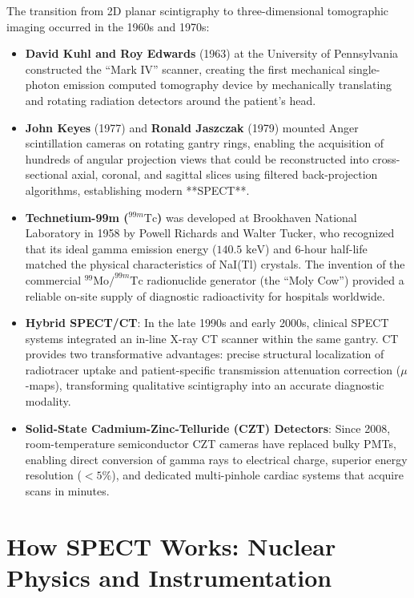 \documentclass[11pt,a4paper]{article}
\begin{document}
The transition from 2D planar scintigraphy to three-dimensional tomographic imaging occurred in the 1960s and 1970s:
\begin{itemize}[leftmargin=*]
    \item \textbf{David Kuhl and Roy Edwards} (1963) at the University of Pennsylvania constructed the ``Mark IV'' scanner, creating the first mechanical single-photon emission computed tomography device by mechanically translating and rotating radiation detectors around the patient's head.
    \item \textbf{John Keyes} (1977) and \textbf{Ronald Jaszczak} (1979) mounted Anger scintillation cameras on rotating gantry rings, enabling the acquisition of hundreds of angular projection views that could be reconstructed into cross-sectional axial, coronal, and sagittal slices using filtered back-projection algorithms, establishing modern **SPECT**.
    \item \textbf{Technetium-99m ($^{99m}\text{Tc}$)} was developed at Brookhaven National Laboratory in 1958 by Powell Richards and Walter Tucker, who recognized that its ideal gamma emission energy ($140.5\text{ keV}$) and $6\text{-hour}$ half-life matched the physical characteristics of NaI(Tl) crystals. The invention of the commercial $^{99}\text{Mo}/^{99m}\text{Tc}$ radionuclide generator (the ``Moly Cow'') provided a reliable on-site supply of diagnostic radioactivity for hospitals worldwide.
    \item \textbf{Hybrid SPECT/CT}: In the late 1990s and early 2000s, clinical SPECT systems integrated an in-line X-ray CT scanner within the same gantry. CT provides two transformative advantages: precise structural localization of radiotracer uptake and patient-specific transmission attenuation correction ($\mu$-maps), transforming qualitative scintigraphy into an accurate diagnostic modality.
    \item \textbf{Solid-State Cadmium-Zinc-Telluride (CZT) Detectors}: Since 2008, room-temperature semiconductor CZT cameras have replaced bulky PMTs, enabling direct conversion of gamma rays to electrical charge, superior energy resolution ($<5\%$), and dedicated multi-pinhole cardiac systems that acquire scans in minutes.
\end{itemize}

\section{How SPECT Works: Nuclear Physics and Instrumentation}
\end{document}
